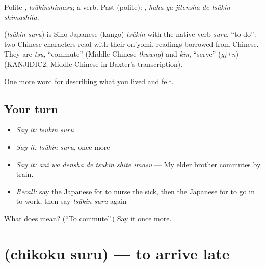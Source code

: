 Polite \textbf{}, \emph{tsūkinshimasu}; a  verb. Past (polite): \textbf{  }, \emph{haha ga jitensha de tsūkin shimashita}.

\begin{cousinweb}
\textbf{} (\emph{tsūkin suru}) is Sino-Japanese (kango) \emph{tsūkin} with the native verb \emph{suru}, \textquotedblleft{}to do\textquotedblright{}: two Chinese characters read with their on'yomi, readings borrowed from Chinese. They are \emph{tsū}, \textquotedblleft{}commute\textquotedblright{} (Middle Chinese \emph{thuwng}) and \emph{kin}, \textquotedblleft{}serve\textquotedblright{} (\emph{gj+n}) (KANJIDIC2; Middle Chinese in Baxter's transcription).
\end{cousinweb}

\begin{grammarlens}[title={What you've built}]
One more word for describing what you lived and felt.
\end{grammarlens}

\subsection*{Your turn}
\begin{itemize}
\raggedright
  \item \emph{Say it:} \emph{tsūkin suru}
  \item \emph{Say it:} \emph{tsūkin suru}, once more
  \item \emph{Say it:} \emph{ani wa densha de tsūkin shite imasu} — My elder brother commutes by train.
  \item \emph{Recall:} say the Japanese for to nurse the sick, then the Japanese for to go in to work, then say \emph{tsūkin suru} again
\end{itemize}

\begin{tcolorbox}[breakable,colback=teal!4,colframe=teal!35!black,title={Before you move on}]
What does  mean? (\textquotedblleft{}To commute\textquotedblright{}.) Say it once more.
\end{tcolorbox}
\section[\texorpdfstring{\ja{ちこくする} (chikoku suru)}{ちこくする (chikoku suru)}]{ (chikoku suru) — to arrive late}

\label{lesson:JA-C451-chikoku-suru}



